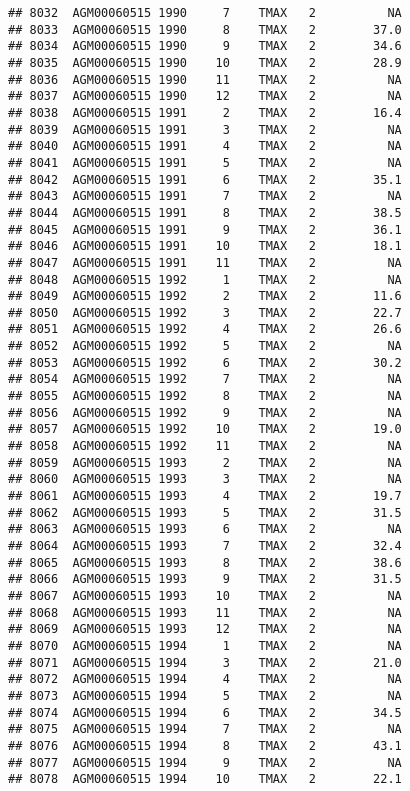 \documentclass{article}\usepackage[]{graphicx}\usepackage[]{color}
\makeatletter
\newenvironment{kframe}{%
 \def\at@end@of@kframe{}%
 \ifinner\ifhmode%
  \def\at@end@of@kframe{\end{minipage}}%
  \begin{minipage}{\columnwidth}%
 \fi\fi%
 \def\FrameCommand##1{\hskip\@totalleftmargin \hskip-\fboxsep
 \colorbox{shadecolor}{##1}\hskip-\fboxsep
     \hskip-\linewidth \hskip-\@totalleftmargin \hskip\columnwidth}%
 \MakeFramed {\advance\hsize-\width
   \@totalleftmargin\z@ \linewidth\hsize
   \@setminipage}}%
 {\par\unskip\endMakeFramed%
 \at@end@of@kframe}
\newenvironment{knitrout}{}{} %
\makeatother
\begin{document}
\begin{knitrout}
\begin{kframe}
\begin{verbatim}
## 8032  AGM00060515 1990     7    TMAX   2          NA
## 8033  AGM00060515 1990     8    TMAX   2        37.0
## 8034  AGM00060515 1990     9    TMAX   2        34.6
## 8035  AGM00060515 1990    10    TMAX   2        28.9
## 8036  AGM00060515 1990    11    TMAX   2          NA
## 8037  AGM00060515 1990    12    TMAX   2          NA
## 8038  AGM00060515 1991     2    TMAX   2        16.4
## 8039  AGM00060515 1991     3    TMAX   2          NA
## 8040  AGM00060515 1991     4    TMAX   2          NA
## 8041  AGM00060515 1991     5    TMAX   2          NA
## 8042  AGM00060515 1991     6    TMAX   2        35.1
## 8043  AGM00060515 1991     7    TMAX   2          NA
## 8044  AGM00060515 1991     8    TMAX   2        38.5
## 8045  AGM00060515 1991     9    TMAX   2        36.1
## 8046  AGM00060515 1991    10    TMAX   2        18.1
## 8047  AGM00060515 1991    11    TMAX   2          NA
## 8048  AGM00060515 1992     1    TMAX   2          NA
## 8049  AGM00060515 1992     2    TMAX   2        11.6
## 8050  AGM00060515 1992     3    TMAX   2        22.7
## 8051  AGM00060515 1992     4    TMAX   2        26.6
## 8052  AGM00060515 1992     5    TMAX   2          NA
## 8053  AGM00060515 1992     6    TMAX   2        30.2
## 8054  AGM00060515 1992     7    TMAX   2          NA
## 8055  AGM00060515 1992     8    TMAX   2          NA
## 8056  AGM00060515 1992     9    TMAX   2          NA
## 8057  AGM00060515 1992    10    TMAX   2        19.0
## 8058  AGM00060515 1992    11    TMAX   2          NA
## 8059  AGM00060515 1993     2    TMAX   2          NA
## 8060  AGM00060515 1993     3    TMAX   2          NA
## 8061  AGM00060515 1993     4    TMAX   2        19.7
## 8062  AGM00060515 1993     5    TMAX   2        31.5
## 8063  AGM00060515 1993     6    TMAX   2          NA
## 8064  AGM00060515 1993     7    TMAX   2        32.4
## 8065  AGM00060515 1993     8    TMAX   2        38.6
## 8066  AGM00060515 1993     9    TMAX   2        31.5
## 8067  AGM00060515 1993    10    TMAX   2          NA
## 8068  AGM00060515 1993    11    TMAX   2          NA
## 8069  AGM00060515 1993    12    TMAX   2          NA
## 8070  AGM00060515 1994     1    TMAX   2          NA
## 8071  AGM00060515 1994     3    TMAX   2        21.0
## 8072  AGM00060515 1994     4    TMAX   2          NA
## 8073  AGM00060515 1994     5    TMAX   2          NA
## 8074  AGM00060515 1994     6    TMAX   2        34.5
## 8075  AGM00060515 1994     7    TMAX   2          NA
## 8076  AGM00060515 1994     8    TMAX   2        43.1
## 8077  AGM00060515 1994     9    TMAX   2          NA
## 8078  AGM00060515 1994    10    TMAX   2        22.1

\end{verbatim}
\end{kframe}
\end{knitrout}
\end{document}
